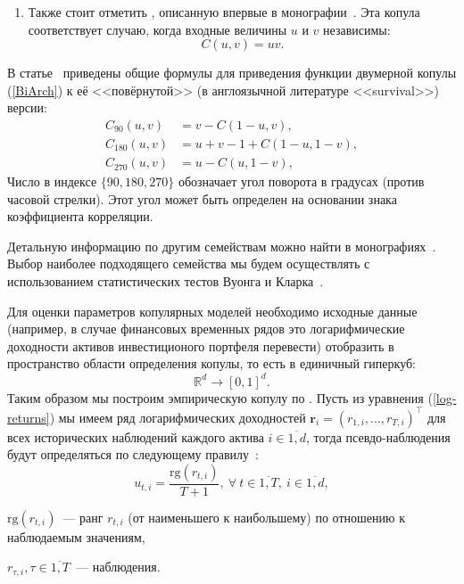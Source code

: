 \begin{enumerate}
\item Также стоит отметить , описанную впервые в монографии~\cite{Nelsen1999}. 
Эта копула соответствует случаю, когда входные величины $u$ и $v$ независимы:
\begin{equation}
    C(u, v) = uv. \nonumber
\end{equation} 
\end{enumerate}

В статье~\cite{Brechmann2013} приведены общие формулы для приведения функции двумерной копулы  (\ref{BiArch}) к её <<повёрнутой>>  (в англоязычной литературе <<survival>>) версии:
\begin{equation} \label{rotatedCop}
\begin{aligned}
    C_{90}(u, v) &= v - C(1 - u, v), \\
    C_{180}(u, v) &= u + v - 1 + C(1 - u, 1 - v), \\
    C_{270}(u, v) &= u - C(u, 1 - v),
\end{aligned}
\end{equation}
%
Число в индексе $\{90, 180, 270\}$ обозначает угол поворота в градусах (против часовой стрелки). Этот угол может быть определен на основании знака коэффициента корреляции.

Детальную информацию по другим семействам можно найти в монографиях~\cite{Joe2014, Nelsen1999}. 
Выбор наиболее подходящего семейства мы будем осуществлять с использованием статистических тестов Вуонга \cite{Vuong1989} и Кларка~\cite{Clarke2007}. 

Для оценки параметров копулярных моделей необходимо исходные данные (например, в случае финансовых временных рядов это логарифмические доходности активов инвестиционого портфеля перевести) отобразить в пространство области определения копулы, то есть в единичный гиперкуб: 
$$\mathbb{R}^d \to [0, 1]^d.$$ 
Таким образом мы построим  эмпирическую копулу по  . 
Пусть из уравнения (\ref{log-returns}) мы имеем ряд логарифмических доходностей $\boldsymbol{r}_i = (r_{1,i}, \ldots, r_{T,i})^\intercal$ для всех исторических наблюдений каждого актива $i \in \overline{1,d}$, тогда псевдо-наблюдения будут определяться по следующему правилу~\cite{Copula}:
\begin{equation} \label{pobs}
    u_{t,i} = \frac{\text{rg}(r_{t,i})}{T + 1},\ \forall \ t \in \overline{1,T},\ i \in \overline{1,d},
\end{equation}
\begin{where}
    \item $\text{rg}(r_{t,i})$~--- ранг $r_{t,i}$ (от наименьшего к наибольшему) по отношению к наблюдаемым значениям,
    \item $r_{\tau,i}, \tau \in \overline{1,T}$~--- наблюдения.
\end{where}

